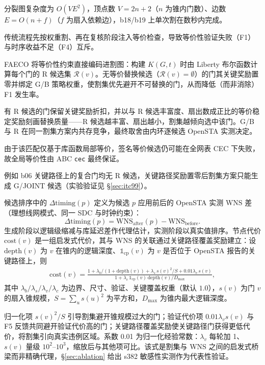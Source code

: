 \documentclass[journal]{IEEEtran}
\begin{document}
分裂图复杂度为 $O(VE^2)$，顶点数 $V=2n+2$（$n$ 为锥内门数）、边数 $E=O(n+f)$（$f$ 为扇入依赖边），b18/b19 上单次割在数秒内完成。

传统流程先按权重割、再在复核阶段注入等价检查，导致等价性验证失败（F1）与时序收益不足（F4）互斥。

FAECO 将等价性约束直接编码进割图：构建 $K(G, t)$ 时由 Liberty 布尔函数计算每个门的 R 候选集 $\mathcal{R}(v)$。无等价替换候选（$\mathcal{R}(v)=\emptyset$）的门其关键奖励置零并绑定 G/B 策略权重，使割集优先避开不可替换的门，从而降低（而非消除）F1 发生率。

有 R 候选的门保留关键奖励折扣，并以与 R 候选丰富度、扇出数成正比的等价稳定奖励刻画替换质量——R 候选越丰富、扇出越小，割集越倾向选中该门。G/B 与 R 在同一割集方案内共存竞争，最终取舍由内环逐候选 OpenSTA 实测决定。

由于该匹配仅基于库函数局部等价，签名等价候选仍可能在全网表 CEC 下失败，故全局等价性由 ABC \texttt{cec} 最终保证。

例如 b06 关键路径上的复合门均无 R 候选，关键路径奖励置零后割集方案只能生成 G/JOINT 候选（实验验证见 \S\ref{sec:itc99}）。

候选排序中的 $\Delta\mathrm{timing}(p)$ 定义为候选 $p$ 应用前后的 OpenSTA 实测 WNS 差（理想线网模式、同一 SDC 与时钟约束）：
\begin{equation}\label{eq:dtiming}
\Delta\mathrm{timing}(p) = \mathrm{WNS}_{\mathrm{after}}(p) - \mathrm{WNS}_{\mathrm{before}}.
\end{equation}
生成阶段以逻辑级缩减与库延迟差作代理估计，实测阶段以真实值排序。节点代价 $\mathrm{cost}(v)$ 是一组启发式代价，其与 WNS 的关联通过关键路径覆盖奖励建立：设 $\mathrm{depth}(v)$ 为 $v$ 在锥内的逻辑深度、$\mathbb{1}_{\mathrm{cp}}(v)$ 为 $v$ 是否位于 OpenSTA 报告的关键路径上，则
{\small
\begin{equation}
\label{eq:cost}
\begin{split}
\mathrm{cost}(v) = \frac{1 + \lambda_b/(1+\mathrm{depth}(v)) + \lambda_s\,s(v)^2/S + 0.01\lambda_v\,s(v)}{1 + \lambda_c\,\mathbb{1}_{\mathrm{cp}}(v)\,\mathrm{depth}(v)/D_{\max}},
\end{split}
\end{equation}
}
其中 $\lambda_b/\lambda_s/\lambda_v/\lambda_c$ 为边界、尺寸、验证、关键覆盖权重（默认 $1.0$），$s(v)$ 为门 $v$ 的扇入锥规模，$S=\sum_u s(u)^2$ 为平方和，$D_{\max}$ 为锥内最大逻辑深度。

归一化项 $s(v)^2/S$ 引导割集避开锥规模过大的门；验证代价项 $0.01\lambda_v s(v)$ 与 F5 反馈共同避开验证代价高的门；关键路径覆盖奖励使关键路径门获得更低代价，将割集引向真实违例区域。系数 0.01 为归一化经验常数：$\lambda_v$ 每轮加 1、$s(v)$ 量级 $10^2$--$10^3$，缩放后与其他项可比。该式是割集与 WNS 之间的启发式桥梁而非精确代理，\S\ref{sec:ablation} 给出 s382 敏感性实测作为代表性验证。
\end{document}
